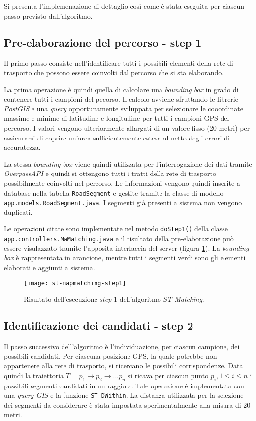 Si presenta l'implemenazione di dettaglio così come è stata eseguita per ciascun passo previsto dall'algoritmo.

\subsection{Pre-elaborazione del percorso - step 1}
Il primo passo consiste nell'identificare tutti i possibili elementi della rete di trasporto che possono essere coinvolti dal percorso che si sta elaborando.

La prima operazione è quindi quella di calcolare una \emph{bounding box} in grado di contenere tutti i campioni del pecorso. Il calcolo avviene sfruttando le librerie \emph{PostGIS} e una \emph{query} opportunamente sviluppata per selezionare le cooordinate massime e minime di latitudine e longitudine per tutti i campioni GPS del percorso. I valori vengono ulteriormente allargati di un valore fisso (20 metri) per assicurarsi di coprire un'area sufficientemente estesa al netto degli errori di accuratezza.

La stessa \emph{bounding box} viene quindi utilizzata per l'interrogazione dei dati tramite \emph{OverpassAPI} e quindi si ottengono tutti i tratti della rete di trasporto possibilmente coinvolti nel percorso. Le informazioni vengono quindi inserite a database nella tabella \texttt{RoadSegment} e gestite tramite la classe di modello \texttt{app.\-models.\-RoadSegment.java}. I segmenti già presenti a sistema non vengono duplicati. 

Le operazioni citate sono implementate nel metodo \texttt{doStep1()} della classe \texttt{app.\-controllers.\-MaMatching.java} e il risultato della pre-elaborazione può essere visulazzato tramite l'apposita interfaccia del server (figura \ref{fig:st-mapmatching-step1}). La \emph{bounding box} è rappresentata in arancione, mentre tutti i segmenti verdi sono gli elementi elaborati e aggiunti a sistema.

\begin{figure}[h]
  \centering
  \texttt{[image: st-mapmatching-step1]}
  \caption{\footnotesize{Risultato dell'esecuzione \emph{step} 1 dell'algoritmo \emph{ST Matching}.}}
  \label{fig:st-mapmatching-step1}
\end{figure}

\subsection{Identificazione dei candidati - step 2}
Il passo successivo dell'algoritmo è l'individuazione, per ciascun campione, dei possibili candidati. Per ciascuna posizione GPS, la quale potrebbe non appartenere alla rete di trasporto, si ricercano le possibili corrispondenze. Data quindi la traiettoria $T=p_1 \rightarrow p_2 \rightarrow ... p_n$ si ricava per ciascun punto $p_i, 1 \leq i \leq n$ i possibili segmenti candidati in un raggio $r$. Tale operazione è implementata con una \emph{query GIS} e la funzione \texttt{ST\_DWithin}. La distanza utilizzata per la selezione dei segmenti da considerare è stata impostata sperimentalmente alla misura di 20 metri. 

